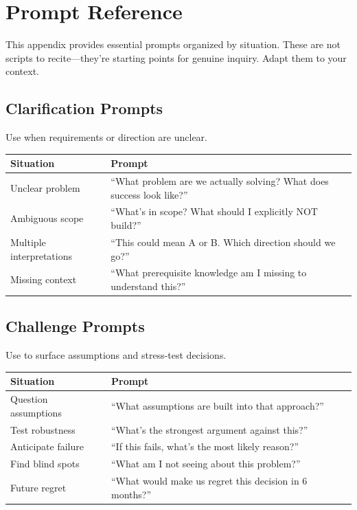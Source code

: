 \chapter{Prompt Reference}\label{ch:prompt-reference}

This appendix provides essential prompts organized by situation. These are not scripts to recite---they're starting points for genuine inquiry. Adapt them to your context.

\section{Clarification Prompts}

Use when requirements or direction are unclear.

\begin{table}[H]
\centering
\begin{tabular}{p{3cm}p{9cm}}
\toprule
\textbf{Situation} & \textbf{Prompt} \\
\midrule
Unclear problem & ``What problem are we actually solving? What does success look like?'' \\
Ambiguous scope & ``What's in scope? What should I explicitly NOT build?'' \\
Multiple interpretations & ``This could mean A or B. Which direction should we go?'' \\
Missing context & ``What prerequisite knowledge am I missing to understand this?'' \\
\bottomrule
\end{tabular}
\end{table}

\section{Challenge Prompts}

Use to surface assumptions and stress-test decisions.

\begin{table}[H]
\centering
\begin{tabular}{p{3cm}p{9cm}}
\toprule
\textbf{Situation} & \textbf{Prompt} \\
\midrule
Question assumptions & ``What assumptions are built into that approach?'' \\
Test robustness & ``What's the strongest argument against this?'' \\
Anticipate failure & ``If this fails, what's the most likely reason?'' \\
Find blind spots & ``What am I not seeing about this problem?'' \\
Future regret & ``What would make us regret this decision in 6 months?'' \\
\bottomrule
\end{tabular}
\end{table}

